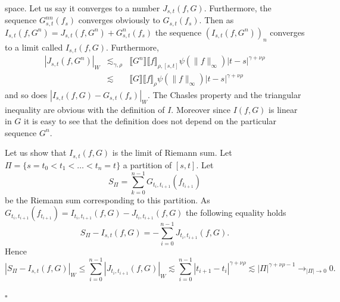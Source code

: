 \documentclass[a4paper,11pt]{article}
\newenvironment{proof}{{\sc Proof.}}{\hfill$\square$}
\begin{document}
\begin{proof}
  space. Let us say it converges to a number $J_{s,t} (f,G)$. Furthermore, the sequence
  $G_{s,t}^{nn} (f_{s} )$ converges obviously to $G_{s,t} (f_{s} )$. Then as
  $I_{s,t} (f,G^{n} ) =J_{s,t} (f,G^{n} ) +G_{s,t}^{n} (f_{s} )$ the sequence
  $( I_{s,t} (f,G^{n} ) )_{n}$ converges to a limit called $I_{s,t} (f,G)$.
  Furthermore,
  \begin{eqnarray*}
    |J_{s,t} (f,G^{n} )|_{W} & \lesssim_{\gamma , \rho} & \llbracket G^{n}
    \rrbracket \llbracket f \rrbracket_{\rho , [s,t]} \psi ( \|f\|_{\infty} )
    |t-s|^{\gamma + \nu \rho}\\
    & \lesssim & \llbracket G \rrbracket \llbracket f \rrbracket_{\rho} \psi
    ( \|f\|_{\infty} ) |t-s|^{\gamma + \nu \rho}
  \end{eqnarray*}
  and so does $|I_{s,t} (f,G)-G_{s,t} (f_{s} )|_{W}$. The Chasles property and
  the triangular inequality are obvious with the definition of $I$. Moreover
  since $I (f,G)$ is linear in $G$ it is easy to see that the definition does
  not depend on the particular sequence $G^{n}$.
  
  Let us show that $I_{s,t} (f,G)$ is the limit of Riemann sum. Let $\Pi =
  \{s=t_{0} <t_{1} < \ldots <t_{n} =t\}$ a partition of $[s,t]$. Let
  \[ S_{\Pi} = \sum_{k=0}^{n-1} G_{t_{i} ,t_{i+1}} (f_{t_{i+1}} ) \]
  be the Riemann sum corresponding to this partition. As $G_{t_{i} ,t_{i+1}}
  (f_{t_{i+1}} ) =I_{t_{i} ,t_{i+1}} (f,G) -J_{t_{i} ,t_{i+1}} (f,G)$ the
  following equality holds
  \[ S_{\Pi} -I_{s,t} (f,G) =- \sum_{i=0}^{n-1} J_{t_{i} ,t_{i+1}} (f,G). \]
  Hence
  \begin{equation*}
    |S_{\Pi} -I_{s,t} (f,G)|_{W}  \leqslant  \sum_{i=0}^{n-1} |J_{t_{i}
    ,t_{i+1}} (f,G)|_{W}
    \lesssim   \sum_{i=0}^{n-1} |t_{i+1} -t_{i} |^{\gamma + \nu \rho}
     \lesssim  | \Pi |^{\gamma + \nu \rho -1} \to_{| \Pi | \to 0} 0.
  \end{equation*}
  

\end{proof}
\end{document}
